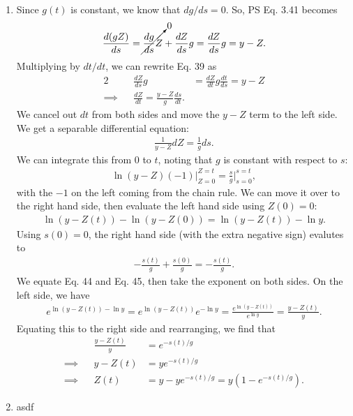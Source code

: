 \documentclass[11pt,letterpaper]{article}
\begin{document}
\begin{enumerate}[label=(\roman*)]
\item Since $g(t)$ is constant, we know that $dg/ds = 0$. So, PS Eq. 3.41 becomes 
    \begin{align}
        \frac{d(gZ)}{ds} = \cancelto{0}{\frac{dg}{ds}Z} + \frac{dZ}{ds}g = \frac{dZ}{ds}g = y-Z.
    \end{align}
    Multiplying by $dt/dt$, we can rewrite Eq. 39 as 
    \begin{alignat}{2}
        &&\frac{dZ}{ds}g &= \frac{dZ}{dt}g\frac{dt}{ds} = y-Z \\
        \implies&&\frac{dZ}{dt} = \frac{y-Z}{g}\frac{ds}{dt}.
    \end{alignat}
    We cancel out $dt$ from both sides and move the $y-Z$ term to the left side. We get a separable differential equation:
    \begin{align}
        \frac{1}{y-Z}dZ = \frac{1}{g}ds.
    \end{align}
    We can integrate this from $0$ to $t$, noting that $g$ is constant with respect to $s$:
    \begin{align}
        \ln{(y-Z)}(-1)\big|^{Z=t}_{Z=0} = \frac{s}{g}\big|^{s=t}_{s=0},
    \end{align}
    with the $-1$ on the left coming from the chain rule. We can move it over to the right hand side, then evaluate the left hand side using $Z(0) = 0$:
    \begin{align}
        \ln{(y-Z(t))} - \ln{(y-Z(0))} = \ln{(y-Z(t))} - \ln{y}.
    \end{align}
    Using $s(0) = 0$, the right hand side (with the extra negative sign) evalutes to 
    \begin{align}
        -\frac{s(t)}{g} + \frac{s(0)}{g} = -\frac{s(t)}{g}.
    \end{align}
    We equate Eq. 44 and Eq. 45, then take the exponent on both sides. On the left side, we have 
    \begin{align}
        e^{\ln{(y-Z(t))} - \ln{y}} = e^{\ln{(y-Z(t))}} e^{-\ln{y}} = \frac{e^{\ln{(y-Z(t))}}}{e^{\ln{y}}} = \frac{y-Z(t)}{y}.
    \end{align}
    Equating this to the right side and rearranging, we find that 
    \begin{align}
        &&\frac{y-Z(t)}{y} &= e^{-s(t)/g} \\
        \implies&&y-Z(t) &= ye^{-s(t)/g} \\
        \implies&&Z(t) &= y - ye^{-s(t)/g} = y(1 - e^{-s(t)/g}).
    \end{align}

\item asdf
\end{enumerate}
\end{document}
